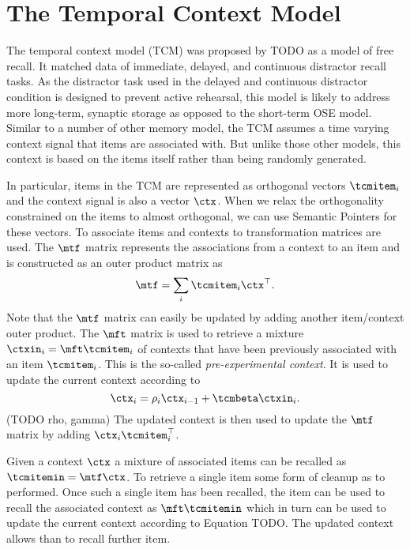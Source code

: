 \chapter{The Temporal Context Model}
The temporal context model (TCM) was proposed by TODO as a model of free recall.
It matched data of immediate, delayed, and continuous distractor recall tasks.
As the distractor task used in the delayed and continuous distractor condition is designed to prevent active rehearsal, this model is likely to address more long-term, synaptic storage as opposed to the short-term OSE model.
Similar to a number of other memory model, the TCM assumes a time varying context signal that items are associated with.
But unlike those other models, this context is based on the items itself rather than being randomly generated.

In particular, items in the TCM are represented as orthogonal vectors $\tcmitem_i$ and the context signal is also a vector $\ctx$.
When we relax the orthogonality constrained on the items to almost orthogonal, we can use Semantic Pointers for these vectors.
To associate items and contexts to transformation matrices are used.
The $\mtf$ matrix represents the associations from a context to an item and is constructed as an outer product matrix as
\begin{equation}
    \mtf = \sum_i \tcmitem_i \ctx\Tr \text{.}
\end{equation}
Note that the $\mtf$ matrix can easily be updated by adding another item/context outer product.
The $\mft$ matrix is used to retrieve a mixture $\ctxin_i = \mft \tcmitem_i$ of contexts that have been previously associated with an item $\tcmitem_i$.
This is the so-called \emph{pre-experimental context}.
It is used to update the current context according to
\begin{equation}
    \ctx_i = \rho_i \ctx_{i-1} + \tcmbeta \ctxin_i \text{.}
\end{equation}
(TODO rho, gamma)
The updated context is then used to update the $\mtf$ matrix by adding $\ctx_i \tcmitem_i\Tr$.

Given a context $\ctx$ a mixture of associated items can be recalled as $\tcmitemin = \mtf \ctx$.
To retrieve a single item some form of cleanup as to performed.
Once such a single item has been recalled, the item can be used to recall the associated context as $\mft \tcmitemin$ which in turn can be used to update the current context according to Equation TODO\@.
The updated context allows than to recall further item.

